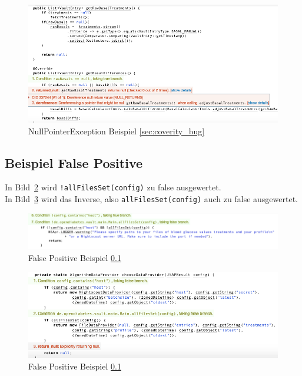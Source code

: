 \documentclass[accentcolor=tud0b,12pt,paper=a4]{tudreport}
\begin{document}
\begin{figure}[h]
\includegraphics[width=1.0\textwidth]{Coverity_Bug}
\caption{NullPointerException Beispiel \ref{sec:coverity_bug}}
\centering
\label{fig:coverity_bug}
\end{figure}

\subsection{Beispiel False Positive}
\label{sec:coverity_fp}
In Bild~\ref{fig:coverity_fp1} wird \texttt{!allFilesSet(config)} zu false ausgewertet.
\\
In Bild~\ref{fig:coverity_fp2} wird das Inverse, also \texttt{allFilesSet(config)} auch zu false ausgewertet.

\begin{figure}[h]
\includegraphics[width=1.0\textwidth]{Coverity_FP1}
\caption{False Positive Beispiel \ref{sec:coverity_fp}}
\centering
\label{fig:coverity_fp1}
\end{figure}

\newpage

\begin{figure}[h]
\includegraphics[width=1.0\textwidth]{Coverity_FP2}
\caption{False Positive Beispiel \ref{sec:coverity_fp}}
\centering
\label{fig:coverity_fp2}
\end{figure}
\end{document}
